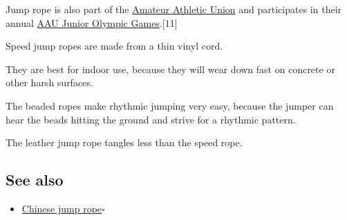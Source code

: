 \documentclass[oneside]{book}
\numberwithin{equation}{section}
\begin{document}
Jump rope is also part of the \href{https://en.wikipedia.org/wiki/Amateur_Athletic_Union}{Amateur Athletic Union} and participates in their annual \href{https://en.wikipedia.org/wiki/AAU_Junior_Olympic_Games}{AAU Junior Olympic Games}.[11]

%
Speed jump ropes are made from a thin vinyl cord.

They are best for indoor use, because they will wear down fast on concrete or other harsh surfaces.

The beaded ropes make rhythmic jumping very easy, because the jumper can hear the beads hitting the ground and strive for a rhythmic pattern.

The leather jump rope tangles less than the speed rope.

\subsection{See also}
\begin{itemize}
    \item \href{https://en.wikipedia.org/wiki/Chinese_jump_rope}{Chinese jump rope}\hfill$\square$
\end{itemize}


\printbibliography[heading=bibintoc]
\end{document}
